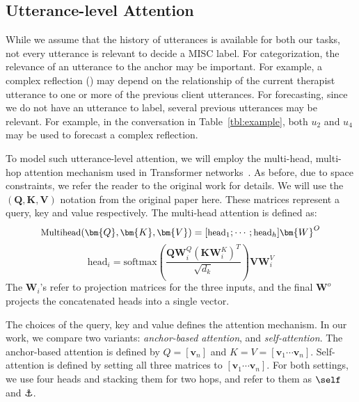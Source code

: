 \subsection{Utterance-level Attention}
\label{ssec:sentence_att}
While we assume that the history of utterances is available for both
our tasks, not every utterance is relevant to decide a MISC label.
%
For categorization, the relevance of an utterance to the anchor may
be important. For example, a complex reflection (\REC) may depend on
the relationship of the current therapist utterance to one or more
of the previous client utterances. For forecasting, since we do not
have an utterance to label, several previous utterances may
be relevant. For example, in the conversation in
Table~\ref{tbl:example}, both $u_2$ and $u_4$ may be used to
forecast a complex reflection.

To model such utterance-level attention, we will employ the
multi-head, multi-hop attention mechanism used in Transformer
networks~\cite{NIPS2017_7181}. As before, due to space constraints,
we refer the reader to the original work for details. We will use
the $(\bm{Q}, \bm{K}, \bm{V})$ notation from the original paper
here. These matrices represent a query, key and value
respectively. The multi-head attention is defined as:
%
\begin{equation}
\label{eq:multihead_attention}
{\small \text{Multihead}(\bm{Q},\bm{K},\bm{V}) = [\text{head}_{1};\cdots; \text{head}_{h}]\bm{W}^{O}}
\end{equation}
\begin{equation*}
 \text{head}_{i} = \text{softmax}\left(\frac{\bm{Q}\bm{W}^{Q}_{i}\left(\bm{K}\bm{W}^{K}_{i}\right)^T}{\sqrt{d_{k}}}\right)\bm{V}\bm{W}^{V}_{i}
\end{equation*}
The $\bm{W}_i$'s refer to projection matrices for the three inputs,
and the final $\bm{W}^o$ projects the concatenated heads into a
single vector.

The choices of the query, key and value defines the attention
mechanism. In our work, we compare two variants: {\em anchor-based
  attention}, and {\em self-attention}. The anchor-based attention
is defined by $Q = [\bm{v}_{n}]$ and
$K=V=[\bm{v}_{1} \cdots \bm{v}_{n}]$.  Self-attention is defined by
setting all three matrices to $[\bm{v}_{1} \cdots \bm{v}_{n}]$.
%
For both settings, we use four heads and stacking them for two hops,
and refer to them as $\self$ and $\anchor$.

